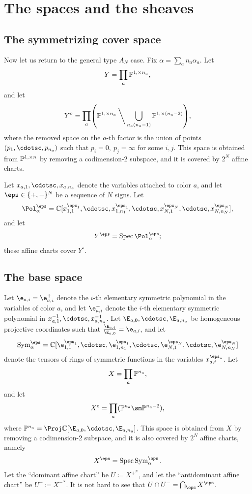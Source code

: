 \documentclass[11pt,reqno]{amsart}
\begin{document}
\section{The spaces and the sheaves}
\subsection{The symmetrizing cover space}
Now let us return to the general type $A_N$ case. Fix $\alpha=\sum_a n_a\alpha_a$. Let
\[Y=\prod_a \mathbb P^{1,\times n_a},\]
and let
\[Y^\circ=\prod_a \pr*{\BP^{1,\times n_a}\mathbin{\bigg\backslash}\bigcup_{n_a(n_a-1)} \BP^{1,\times (n_a-2)}},\]
where the removed space on the $a$-th factor is the union of points $(p_1,\cdotsc,p_{n_a})$ such that $p_i=0,\ p_j=\infty$ for some $i,j$. This space is obtained from $\mathbb P^{1,\times n}$ by removing a codimension-2 subspace, and it is covered by $2^N$ affine charts.

Let $x_{a,1},\cdotsc,x_{a,n_a}$ denote the variables attached to color $a$, and let $\eps\in\{+,-\}^N$ be a sequence of $N$ signs. Let 
\[\Pol_\alpha^\eps=\BC[x_{1,1}^{\eps_1},\cdotsc,x_{1,n_1}^{\eps_1},\cdotsc,x_{N,1}^{\eps_N},\cdotsc,x_{N,n_N}^{\eps_N}],\] 
and let
\[Y^\eps= \Spec \Pol_\alpha^\eps;\] 
these affine charts cover $Y^\circ$.


\subsection{The base space}
Let $\e_{a,i}=\e_{a,i}^+$ denote the $i$-th elementary symmetric polynomial in the variables of color $a$, and let $\e_{a,i}^-$ denote the $i$-th elementary symmetric polynomial in $x_{a,1}^{-1},\cdotsc,x_{a,n_a}^{-1}$. Let $\E_{a,0},\cdotsc,\E_{a,n_a}$ be homogeneous projective coordinates such that $\frac{\E_{a,i}}{\E_{a,0}}=\e_{a,i}$, and let 
\[\Sym_\alpha^\eps=\BC[\e_{1,1}^{\eps_1},\cdotsc,\e_{1,n_1}^{\eps_1},\cdotsc,\e_{N,1}^{\eps_N},\cdotsc,\e_{N,n_N}^{\eps_N}]\] 
denote the tensors of rings of symmetric functions in the variables $x_{a,i}^{\eps_a}$. Let 
\[X=\prod_a \mathbb P^{n_a},\]
and let
\[X^\circ=\prod_a (\BP^{n_a}\sm \BP^{n_a-2}),\] 
where $\BP^{n_a}=\Proj \BC[\E_{a,0},\cdotsc,\E_{a,n_a}]$. This space is obtained from $X$ by removing a codimension-2 subspace, and it is also covered by $2^N$ affine charts, namely
\[X^\eps=\Spec \Sym_\alpha^\eps.\]
Let the ``dominant affine chart'' be $U\coloneqq X^{+^N}$, and let the ``antidominant affine chart'' be $U^-\coloneqq X^{-^N}$. It is not hard to see that $U\cap U^-=\bigcap_\eps X^\eps$.
\end{document}
